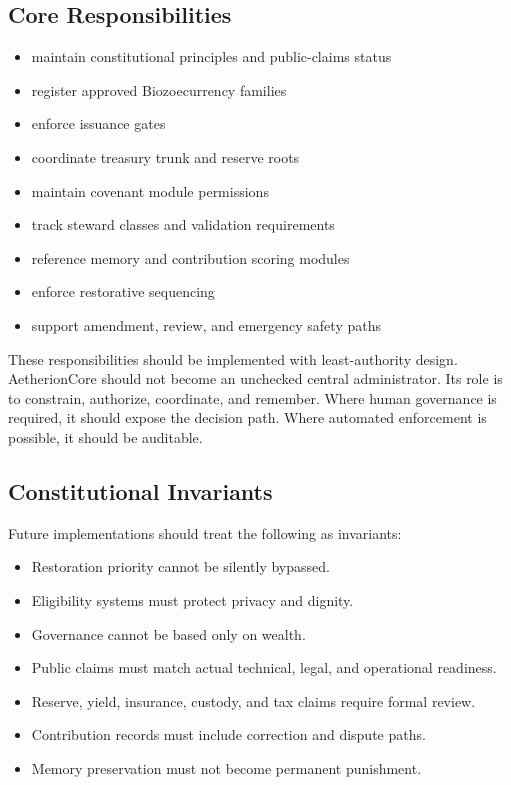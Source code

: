 \documentclass[12pt]{article}
\begin{document}
\subsection{Core Responsibilities}

\begin{itemize}
  \item maintain constitutional principles and public-claims status
  \item register approved Biozoecurrency families
  \item enforce issuance gates
  \item coordinate treasury trunk and reserve roots
  \item maintain covenant module permissions
  \item track steward classes and validation requirements
  \item reference memory and contribution scoring modules
  \item enforce restorative sequencing
  \item support amendment, review, and emergency safety paths
\end{itemize}

These responsibilities should be implemented with least-authority design. AetherionCore should not become an unchecked central administrator. Its role is to constrain, authorize, coordinate, and remember. Where human governance is required, it should expose the decision path. Where automated enforcement is possible, it should be auditable.

\subsection{Constitutional Invariants}

Future implementations should treat the following as invariants:

\begin{itemize}
  \item Restoration priority cannot be silently bypassed.
  \item Eligibility systems must protect privacy and dignity.
  \item Governance cannot be based only on wealth.
  \item Public claims must match actual technical, legal, and operational readiness.
  \item Reserve, yield, insurance, custody, and tax claims require formal review.
  \item Contribution records must include correction and dispute paths.
  \item Memory preservation must not become permanent punishment.
\end{itemize}
\end{document}
